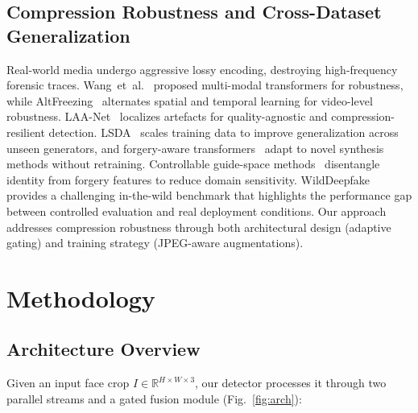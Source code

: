 \documentclass[conference]{IEEEtran}
\begin{document}
\subsection{Compression Robustness and Cross-Dataset Generalization}
Real-world media undergo aggressive lossy encoding, destroying high-frequency forensic traces.
Wang~et~al.~\cite{wang2022m2tr} proposed multi-modal transformers for robustness, while AltFreezing~\cite{wang2023altfreezing} alternates spatial and temporal learning for video-level robustness.
LAA-Net~\cite{nguyen2024laanet} localizes artefacts for quality-agnostic and compression-resilient detection.
LSDA~\cite{chen2024lsda} scales training data to improve generalization across unseen generators, and forgery-aware transformers~\cite{liu2024forgery} adapt to novel synthesis methods without retraining.
Controllable guide-space methods~\cite{guo2023controllable} disentangle identity from forgery features to reduce domain sensitivity.
WildDeepfake~\cite{wang2024wilddeepfake} provides a challenging in-the-wild benchmark that highlights the performance gap between controlled evaluation and real deployment conditions.
Our approach addresses compression robustness through both architectural design (adaptive gating) and training strategy (JPEG-aware augmentations).

\section{Methodology}

\subsection{Architecture Overview}
Given an input face crop $I \in \mathbb{R}^{H \times W \times 3}$, our detector processes it through two parallel streams and a gated fusion module (Fig.~\ref{fig:arch}):
\end{document}
